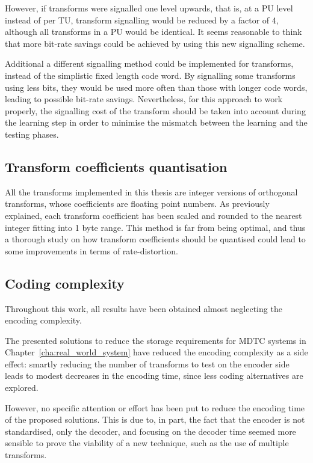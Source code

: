 \documentclass[11pt,a4paper,openright,twoside]{book}
\numberwithin{equation}{section} %
\numberwithin{figure}{section} %
\numberwithin{table}{section} %
\begin{document}
However, if transforms were signalled one level upwards, that is, at a \ac{PU}
level instead of per \ac{TU}, transform signalling would be reduced by a
factor of 4, although all transforms in a \ac{PU} would be identical.
It seems reasonable to think that more bit-rate savings could be achieved by
using this new signalling scheme.

Additional a different signalling method could be implemented for transforms,
instead of the simplistic fixed length code word.
By signalling some transforms using less bits, they would be used more often
than those with longer code words, leading to possible bit-rate savings.
Nevertheless, for this approach to work properly, the signalling cost of the
transform should be taken into account during the learning step in order to
minimise the mismatch between the learning and the testing phases.

\subsection*{Transform coefficients quantisation}
\label{sub:transform_coefficients_quantisation}

All the transforms implemented in this thesis are integer versions of
orthogonal transforms, whose coefficients are floating point numbers.
As previously explained, each transform coefficient has been scaled and
rounded to the nearest integer fitting into 1 byte range.
This method is far from being optimal, and thus a thorough study on how
transform coefficients should be quantised could lead to some improvements in
terms of rate-distortion.

\subsection*{Coding complexity}
\label{sub:coding_complexity}

Throughout this work, all results have been obtained almost neglecting the
encoding complexity.

The presented solutions to reduce the storage requirements for \ac{MDTC}
systems in Chapter~\ref{cha:real_world_system} have reduced the encoding
complexity as a side effect:
smartly reducing the number of transforms to test on the encoder side leads to
modest decreases in the encoding time, since less coding alternatives are
explored.

However, no specific attention or effort has been put to reduce the encoding
time of the proposed solutions.
This is due to, in part, the fact that the encoder is not standardised, only
the decoder, and focusing on the decoder time seemed more sensible to prove
the viability of a new technique, such as the use of multiple transforms.
\end{document}
